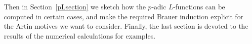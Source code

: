 \documentclass{amsart}
\begin{document}
Then in Section~\ref{pLsection} we sketch how the {$p$-adic{\futurelet{}}} {$L$-functions{\futurelet{}}} can be computed in certain cases,
and make the required Brauer induction explicit for the Artin motives we want to consider.  Finally,
the last section is devoted to the results of the numerical calculations for examples.
\end{document}
